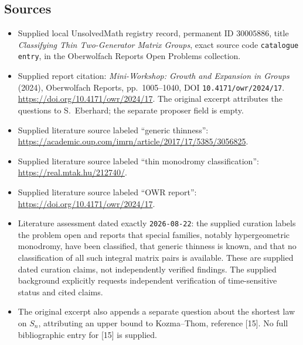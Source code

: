 \documentclass[11pt]{article}
\begin{document}
\subsection{Sources}
\begin{itemize}
\item Supplied local UnsolvedMath registry record, permanent ID \(30005886\), title \emph{Classifying Thin Two-Generator Matrix Groups}, exact source code \texttt{catalogue entry}, in the Oberwolfach Reports Open Problems collection.
\item Supplied report citation: \emph{Mini-Workshop: Growth and Expansion in Groups} (2024), Oberwolfach Reports, pp.\ 1005--1040, DOI \texttt{10.4171/owr/2024/17}. \url{https://doi.org/10.4171/owr/2024/17}. The original excerpt attributes the questions to S.\ Eberhard; the separate proposer field is empty.
\item Supplied literature source labeled ``generic thinness'': \url{https://academic.oup.com/imrn/article/2017/17/5385/3056825}.
\item Supplied literature source labeled ``thin monodromy classification'': \url{https://real.mtak.hu/212740/}.
\item Supplied literature source labeled ``OWR report'': \url{https://doi.org/10.4171/owr/2024/17}.
\item Literature assessment dated exactly \texttt{2026-08-22}: the supplied curation labels the problem open and reports that special families, notably hypergeometric monodromy, have been classified, that generic thinness is known, and that no classification of all such integral matrix pairs is available. These are supplied dated curation claims, not independently verified findings. The supplied background explicitly requests independent verification of time-sensitive status and cited claims.
\item The original excerpt also appends a separate question about the shortest law on \(S_n\), attributing an upper bound to Kozma--Thom, reference [15]. No full bibliographic entry for [15] is supplied.
\end{itemize}
\end{document}
